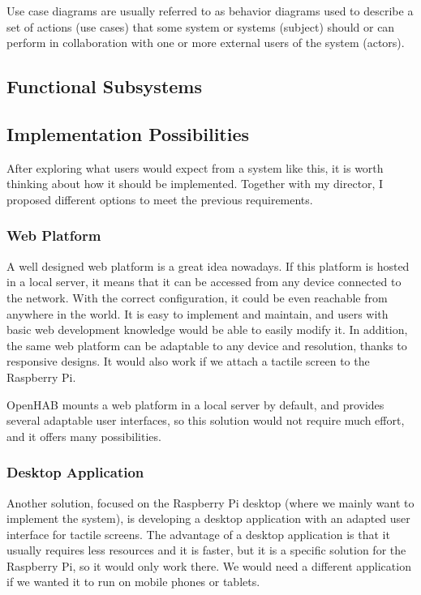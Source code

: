 Use case diagrams are usually referred to as behavior diagrams used to describe a set of actions (use cases) that some system or 
systems (subject) should or can perform in collaboration with one or more external users of the system (actors).\cite{umlUseCaseDiagrams}


\subsection{Functional Subsystems}

\subsection{Implementation Possibilities}
After exploring what users would expect from a system like this, it is worth thinking about how it should be implemented. Together 
with my director, I proposed different options to meet the previous requirements.

\subsubsection{Web Platform}
A well designed web platform is a great idea nowadays. If this platform is hosted in a local server, it means that it can be accessed
from any device connected to the network. With the correct configuration, it could be even reachable from anywhere in the world.
It is easy to implement and maintain, and users with basic web development knowledge would be able to easily modify it. In addition,
the same web platform can be adaptable to any device and resolution, thanks to responsive designs. It would also work if we attach
a tactile screen to the Raspberry Pi.

OpenHAB mounts a web platform in a local server by default, and provides several adaptable user interfaces, so this solution would
not require much effort, and it offers many possibilities.

\subsubsection{Desktop Application}
Another solution, focused on the Raspberry Pi desktop (where we mainly want to implement the system), is developing a desktop 
application with an adapted user interface for tactile screens. The advantage of a desktop application is that it usually requires 
less resources and it is faster, but it is a specific solution for the Raspberry Pi, so it would only work there. We would need a 
different application if we wanted it to run on mobile phones or tablets.

